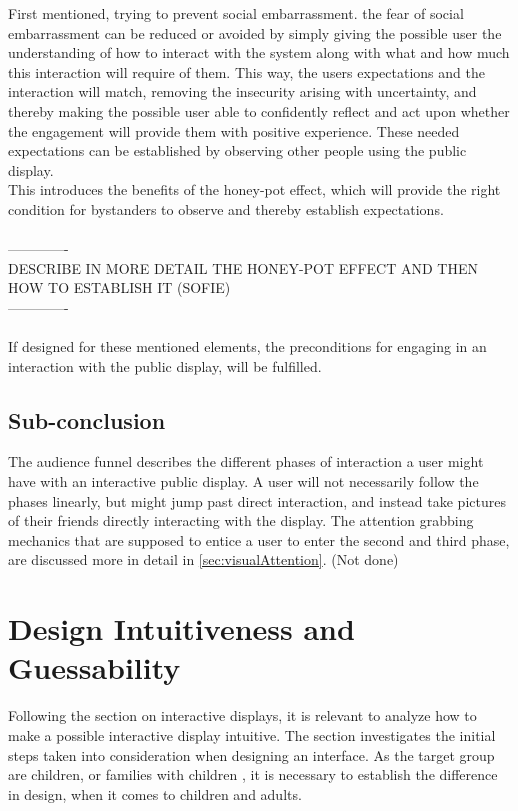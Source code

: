 First mentioned, trying to prevent social embarrassment. 
the fear of social embarrassment can be reduced or avoided by simply giving the possible user the understanding of how to interact with the system along with what and how much this interaction will require of them. This way, the users expectations and the interaction will match, removing the insecurity arising with uncertainty, and thereby making the possible user able to confidently reflect and act upon whether the engagement will provide them with positive experience. 
These needed expectations can be established by observing other people using the public display. \\
This introduces the benefits of the honey-pot effect, which will provide the right condition for bystanders to observe and thereby establish expectations.  
\\\\
-------------\\
DESCRIBE IN MORE DETAIL THE HONEY-POT EFFECT AND THEN HOW TO ESTABLISH IT (SOFIE) \\-------------\\
\\
If designed for these mentioned elements, the preconditions for engaging in an interaction with the public display, will be fulfilled. 

     \subsection*{Sub-conclusion}
        The audience funnel describes the different phases of interaction a user might have with an interactive public display. A user will not necessarily follow the phases linearly, but might jump past direct interaction, and instead take pictures of their friends directly interacting with the display. The attention grabbing mechanics that are supposed to entice a user to enter the second and third phase, are discussed more in detail in \autoref{sec:visualAttention}. (Not done)

    
\section{Design Intuitiveness and Guessability} %
Following the section on interactive displays, it is relevant to analyze how to make a possible interactive display intuitive. The section investigates the initial steps taken into consideration when designing an interface. As the target group are children, or families with children , it is necessary to establish the difference in design, when it comes to children and adults.\\

